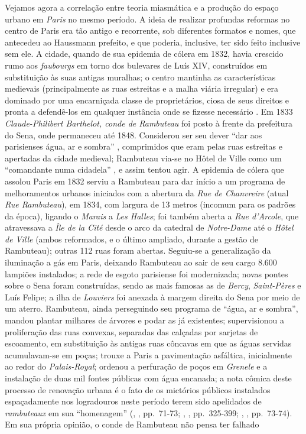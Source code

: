 Vejamos agora a correlação entre teoria miasmática e a produção do espaço urbano em \textit{Paris} no mesmo período. A ideia de realizar profundas reformas no centro de Paris era tão antigo e recorrente, sob diferentes formatos e nomes, que antecedeu ao Haussmann prefeito, e que poderia, inclusive, ter sido feito inclusive sem ele. A cidade, quando de sua epidemia de cólera em 1832, havia crescido rumo aos \textit{faubourgs} em torno dos bulevares de Luís XIV, construídos em substituição às suas antigas muralhas; o centro mantinha as características medievais (principalmente as ruas estreitas e a malha viária irregular) e era dominado por uma encarniçada classe de proprietários, ciosa de seus direitos e pronta a defendê-los em qualquer instância onde se fizesse necessário \cite{faure_paris_2004}. Em 1833 \textit{Claude-Philibert Barthelot, conde de Rambuteau} foi posto à frente da prefeitura do Sena, onde permaneceu até 1848. Considerou ser seu dever ``dar aos parisienses água, ar e sombra'' \cite[p.~269]{rambuteau1905memoires}, comprimidos que eram pelas ruas estreitas e apertadas da cidade medieval; Rambuteau via-se no Hôtel de Ville como um ``comandante numa cidadela'' \cite[p.~269]{rambuteau1905memoires}, e assim tentou agir. A epidemia de cólera que assolou Paris em 1832 serviu a Rambuteau para dar início a um programa de melhoramentos urbanos iniciados com a abertura da \textit{Rue de Chanvreire} (atual \textit{Rue Rambuteau}), em 1834, com largura de 13 metros (incomum para os padrões da época), ligando o \textit{Marais} a \textit{Les Halles}; foi também aberta a \textit{Rue d'Arcole}, que atravessava a \textit{Île de la Cité} desde o arco da catedral de \textit{Notre-Dame} até o \textit{Hôtel de Ville} (ambos reformados, e o último ampliado, durante a gestão de Rambuteau); outras 112 ruas foram abertas. Seguiu-se a generalização da iluminação a gás em Paris, deixando Rambuteau ao sair de seu cargo 8.600 lampiões instalados; a rede de esgoto parisiense foi modernizada; novas pontes sobre o Sena foram construídas, sendo as mais famosas as de \textit{Bercy}, \textit{Saint-Pères} e Luís Felipe; a ilha de \textit{Louviers} foi anexada à margem direita do Sena por meio de um aterro. Rambuteau, ainda perseguindo seu programa de ``água, ar e sombra'', mandou plantar milhares de árvores e podar as já existentes; supervisionou a proliferação das ruas convexas, separadas das calçadas por sarjetas de escoamento, em substituição às antigas ruas côncavas em que as águas servidas acumulavam-se em poças; trouxe a Paris a pavimentação asfáltica, inicialmente ao redor do \textit{Palais-Royal}; ordenou a perfuração de poços em \textit{Grenele} e a instalação de duas mil fontes públicas com água encanada; a nota cômica deste processo de renovação urbana é o fato de os mictórios públicos instalados espaçadamente nos logradouros neste período terem sido apelidados de \textit{rambuteaux} em sua ``homenagem'' (\citeauthor{combeau_paris_2011}, \citeyear{combeau_paris_2011}, pp.~71-73; \citeauthor{rambuteau1905memoires}, \citeyear{rambuteau1905memoires}, pp.~325-399; \citeauthor{petti_eurfranba_2011}, \citeyear{petti_eurfranba_2011}, pp.~73-74). Em sua própria opinião, o conde de Rambuteau não pensa ter falhado 